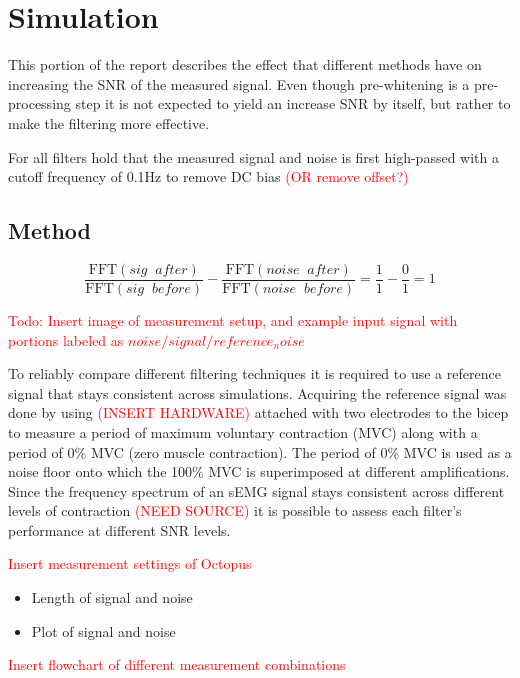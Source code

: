 \chapter{Simulation}
This portion of the report describes the effect that different methods have on increasing the SNR of the measured signal. Even though pre-whitening is a pre-processing step it is not expected to yield an increase SNR by itself, but rather to make the filtering more effective.

For all filters hold that the measured signal and noise is first high-passed with a cutoff frequency of 0.1Hz to remove DC bias \textcolor{red}{(OR remove offset?)}

\section{Method}

\begin{equation}
    \frac{\text{FFT}(sig \;\; after)}{\text{FFT}(sig \;\;  before)} - \frac{\text{FFT}(noise \;\;  after)}{\text{FFT}(noise \;\;  before)} = \frac{1}{1} - \frac{0}{1} = 1
\end{equation}

\textcolor{red}{Todo: Insert image of measurement setup, and example input signal with portions labeled as $noise/signal/reference_noise$}


To reliably compare different filtering techniques it is required to use a reference signal that stays consistent across simulations. Acquiring the reference signal was done by using \textcolor{red}{(INSERT HARDWARE)} attached with two electrodes to the bicep to measure a period of maximum voluntary contraction (MVC) along with a period of 0\% MVC (zero muscle contraction). The period of 0\% MVC is used as a noise floor onto which the 100\% MVC is superimposed at different amplifications. Since the frequency spectrum of an sEMG signal stays consistent across different levels of contraction \textcolor{red}{(NEED SOURCE)} it is possible to assess each filter's performance at different SNR levels.

\textcolor{red}{Insert measurement settings of Octopus}

\begin{itemize}
    \item Length of signal and noise
    \item Plot of signal and noise
\end{itemize}

\textcolor{red}{Insert flowchart of different measurement combinations}

